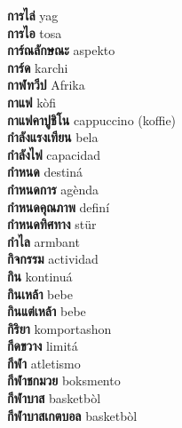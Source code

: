 \textbf{ การไล่  } yag \\
\textbf{ การไอ  } tosa \\
\textbf{ การ์ณลักษณะ  } aspekto \\
\textbf{ การ์ด  } karchi \\
\textbf{ กาฬทวีป  } Afrika \\
\textbf{ กาแฟ  } kòfi \\
\textbf{ กาแฟคาปูชิโน  } cappuccino (koffie) \\
\textbf{ กำลังแรงเทียน  } bela \\
\textbf{ กำลังไฟ  } capacidad \\
\textbf{ กำหนด  } destiná \\
\textbf{ กำหนดการ  } agènda \\
\textbf{ กำหนดคุณภาพ  } definí \\
\textbf{ กำหนดทิศทาง  } stür \\
\textbf{ กำไล  } armbant \\
\textbf{ กิจกรรม  } actividad \\
\textbf{ กิน  } kontinuá \\
\textbf{ กินเหล้า  } bebe \\
\textbf{ กินแต่เหล้า  } bebe \\
\textbf{ กิริยา  } komportashon \\
\textbf{ กีดขวาง  } limitá \\
\textbf{ กีฬา  } atletismo \\
\textbf{ กีฬาชกมวย  } boksmento \\
\textbf{ กีฬาบาส  } basketbòl \\
\textbf{ กีฬาบาสเกตบอล  } basketbòl \\
